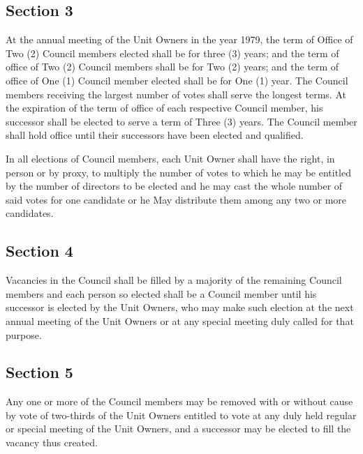 \documentclass[
]{book}
\begin{document}
\hypertarget{section-3-1}{%
\subsection*{Section 3}\label{section-3-1}}

At the annual meeting of the Unit Owners in the year 1979, the term of Office of Two (2) Council members elected shall be for three (3) years; and the term of office of Two (2) Council members shall be for Two (2) years; and the term of office of One (1) Council member elected shall be for One (1) year. The Council members receiving the largest number of votes shall serve the longest terms. At the expiration of the term of office of each respective Council member, his successor shall be elected to serve a term of Three (3) years. The Council member shall hold office until their successors have been elected and qualified.

In all elections of Council members, each Unit Owner shall have the right, in person or by proxy, to multiply the number of votes to which he may be entitled by the number of directors to be elected and he may cast the whole number of said votes for one candidate or he May distribute them among any two or more candidates.

\hypertarget{section-4-1}{%
\subsection*{Section 4}\label{section-4-1}}

Vacancies in the Council shall be filled by a majority of the remaining Council members and each person so elected shall be a Council member until his successor is elected by the Unit Owners, who may make such election at the next annual meeting of the Unit Owners or at any special meeting duly called for that purpose.

\hypertarget{section-5-1}{%
\subsection*{Section 5}\label{section-5-1}}

Any one or more of the Council members may be removed with or without cause by vote of two-thirds of the Unit Owners entitled to vote at any duly held regular or special meeting of the Unit Owners, and a successor may be elected to fill the vacancy thus created.
\end{document}
